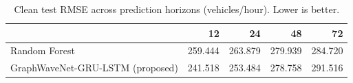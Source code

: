 \begin{table}
\caption{Clean test RMSE across prediction horizons (vehicles/hour). Lower is better.}
\label{tab:clean_rmse}
\begin{tabular}{lrrrr}
\toprule
 & 12 & 24 & 48 & 72 \\
\midrule
Random Forest & 259.444 & 263.879 & 279.939 & 284.720 \\
GraphWaveNet-GRU-LSTM (proposed) & 241.518 & 253.484 & 278.758 & 291.516 \\
\bottomrule
\end{tabular}
\end{table}
